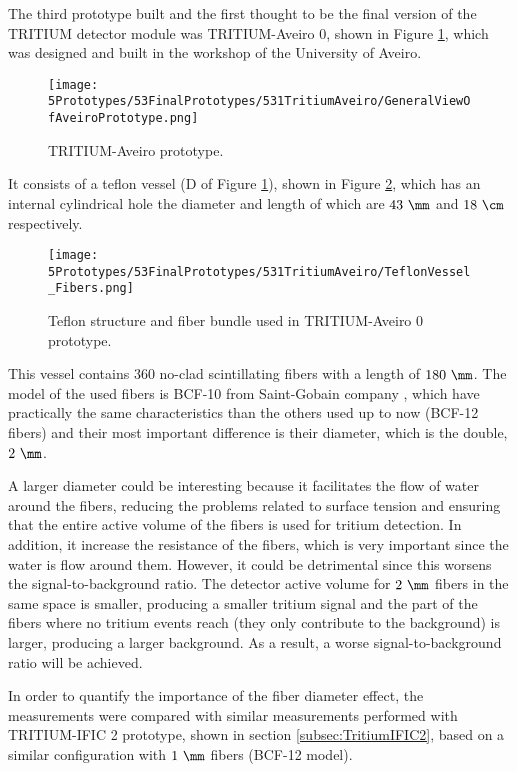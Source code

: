The third prototype built and the first thought to be the final version of the TRITIUM detector module was TRITIUM-Aveiro 0, shown in Figure \ref{fig:TritiumAveiro0}, which was designed and built in the workshop of the University of Aveiro. 

\begin{figure}[h]
\centering
\texttt{[image: 5Prototypes/53FinalPrototypes/531TritiumAveiro/GeneralViewOfAveiroPrototype.png]}
\caption{TRITIUM-Aveiro prototype.\label{fig:TritiumAveiro0}}
\end{figure}


It consists of a teflon vessel (D of Figure \ref{fig:TritiumAveiro0}), shown in Figure \ref{fig:TeflonStructureFibersTritiumAveiro0}, which has an internal cylindrical hole the diameter and length of which are $43~\mm$ and $18~\cm$ respectively. 

\begin{figure}[h]
\centering
\texttt{[image: 5Prototypes/53FinalPrototypes/531TritiumAveiro/TeflonVessel\_Fibers.png]}
\caption{Teflon structure and fiber bundle used in TRITIUM-Aveiro 0 prototype.\label{fig:TeflonStructureFibersTritiumAveiro0}}
\end{figure}

This vessel contains $360$ no-clad scintillating fibers with a length of $180~\mm$. The model of the used fibers is BCF-10 from Saint-Gobain company \cite{DataSheetBCF10Fiber}, which have practically the same characteristics than the others used up to now (BCF-12 fibers) and their most important difference is their diameter, which is the double, $2~\mm$.

A larger diameter could be interesting because it facilitates the flow of water around the fibers, reducing the problems related to surface tension and ensuring that the entire active volume of the fibers is used for tritium detection. In addition, it increase the resistance of the fibers, which is very important since the water is flow around them. However, it could be detrimental since this worsens the signal-to-background ratio. The detector active volume for $2~\mm$ fibers in the same space is smaller, producing a smaller tritium signal and the part of the fibers where no tritium events reach (they only contribute to the background) is larger, producing a larger background. As a result, a worse signal-to-background ratio will be achieved.

In order to quantify the importance of the fiber diameter effect, the measurements were compared with similar measurements performed with TRITIUM-IFIC 2 prototype, shown in section \ref{subsec:TritiumIFIC2}, based on a similar configuration with $1~\mm$ fibers (BCF-12 model).

